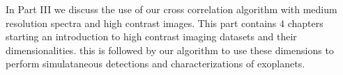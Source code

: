 In Part III we discuss the use of our cross correlation algorithm with medium resolution spectra and high contrast images.
This part contains $4$ chapters starting an introduction to high contrast imaging datasets and their dimensionalities.
this is followed by our algorithm to use these dimensions to perform simulataneous detections and characterizations of exoplanets.
